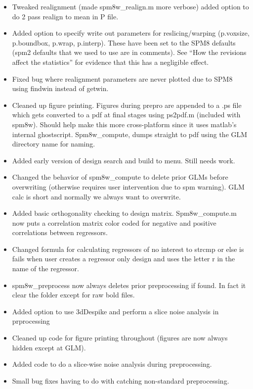 \documentclass[12pt]{article}
\begin{document}
\begin{itemize}
	\item Tweaked realignment (made spm8w\_realign.m more verbose) added option to do 2 pass realign to mean in P file. 
	\item Added option to specify write out parameters for reslicing/warping (p.voxsize, \newline p.boundbox, p.wrap, p.interp). These have been set to the SPM8 defaults (spm2 defaults that we used to use are in comments). See “How the revisions affect the statistics” for evidence that this has a negligible effect.
	\item Fixed bug where realignment parameters are never plotted due to SPM8 using findwin instead of getwin.
	\item Cleaned up figure printing. Figures during prepro are appended to a .ps file which gets converted to a pdf at final stages using ps2pdf.m (included with spm8w). Should help make this more cross-platform since it uses matlab’s internal ghostscript. Spm8w\_compute, dumps straight to pdf using the GLM directory name for naming. 
	\item Added early version of design search and build to menu. Still needs work. 
	\item Changed the behavior of spm8w\_compute to delete prior GLMs before overwriting (otherwise requires user intervention due to spm warning). GLM calc is short and normally we always want to overwrite. 
	\item Added basic orthogonality checking to design matrix. Spm8w\_compute.m now puts a correlation matrix color coded for negative and positive correlations between regressors.
	\item Changed formula for calculating regressors of no interest to strcmp or else is fails when user creates a regressor only design and uses the letter r in the name of the regressor.
	\item spm8w\_preprocess now always deletes prior preprocessing if found. In fact it clear the folder except for raw bold files. 
	\item Added option to use 3dDespike and perform a slice noise analysis in prprocessing
	\item Cleaned up code for figure printing throughout (figures are now always hidden except at GLM). 
	\item Added code to do a slice-wise noise analysis during preprocessing.
	\item Small bug fixes having to do with catching non-standard preprocessing.
\end{itemize}
\end{document}
